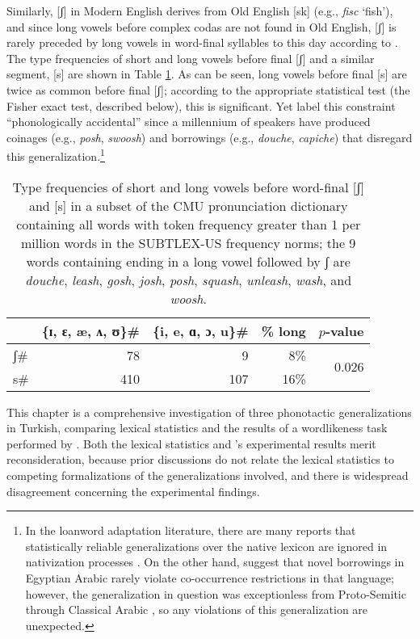 Similarly, [ʃ] in Modern English derives from Old English [sk] (e.g., \emph{fisc} `fish'), and since long vowels before complex codas are not found in Old English, [ʃ] is rarely preceded by long vowels in word-final syllables to this day according to \citet{Iverson2005}. The type frequencies of short and long vowels before final [ʃ] and a similar segment, [s] are shown in Table \ref{ssh}. As can be seen, long vowels before final [s] are twice as common before final [ʃ]; according to the appropriate statistical test (the Fisher exact test, described below), this is significant. Yet \citet{Iverson2005} label this constraint ``phonologically accidental'' since a millennium of speakers have produced coinages (e.g., \emph{posh}, \emph{swoosh}) and  borrowings (e.g., \emph{douche}, \emph{capiche}) that disregard this generalization.\footnote{In the loanword adaptation literature, there are many reports that statistically reliable generalizations over the native lexicon are ignored in nativization processes \citep[e.g.,][]{Ito1995a,Ito1995b,Ussishkin2003}. On the other hand, \citet{Frisch2001} suggest that novel borrowings in Egyptian Arabic rarely violate co-occurrence restrictions in that language; however, the generalization in question was exceptionless from Proto-Semitic \citep{Ehret1989} through Classical Arabic \citep{Greenberg1950}, so any violations of this generalization are unexpected.}

\begin{table}
\centering
\begin{tabular}{l r r r r}
\toprule
          & \{ɪ, ɛ, æ, ʌ, ʊ\}\gap{}\# & \{i, e, ɑ, ɔ, u\}\gap{}\# & \% long & $p$-value \\
\midrule
\gap{}ʃ\# & 78                & 9                 & 8\%      & \multirow{2}{*}{0.026} \\
\gap{}s\# & 410               & 107               & 16\%     & \\
\bottomrule
\end{tabular}
\caption{Type frequencies of short and long vowels before word-final [ʃ] and [s] in a subset of the CMU pronunciation dictionary containing all words with token frequency greater than 1 per million words in the SUBTLEX-US frequency norms; the 9 words containing ending in a long vowel followed by ʃ are \emph{douche}, \emph{leash}, \emph{gosh}, \emph{josh}, \emph{posh}, \emph{squash}, \emph{unleash}, \emph{wash}, and \emph{woosh}.}
\label{ssh}
\end{table}

This chapter is a comprehensive investigation of three phonotactic generalizations in Turkish, comparing lexical statistics and the results of a wordlikeness task performed by \citet{Zimmer1969}. Both the lexical statistics and \citeauthor{Zimmer1969}'s experimental results merit reconsideration, because prior discussions do not relate the lexical statistics to competing formalizations of the generalizations involved, and there is widespread disagreement concerning the experimental findings.

